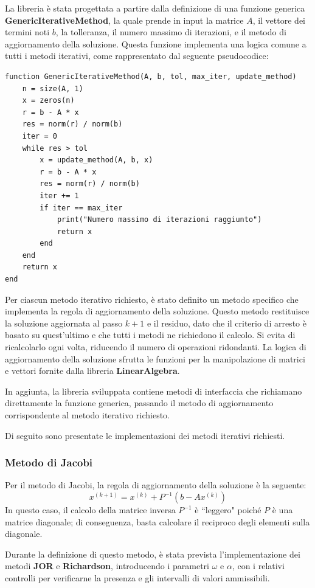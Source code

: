 La libreria è stata progettata a partire dalla definizione di una funzione generica
\textbf{GenericIterativeMethod}, la quale prende in input la matrice $A$, il
vettore dei termini noti $b$, la tolleranza, il numero massimo di iterazioni, e
il metodo di aggiornamento della soluzione. Questa funzione implementa una logica
comune a tutti i metodi iterativi, come rappresentato dal seguente pseudocodice:
\begin{verbatim}
function GenericIterativeMethod(A, b, tol, max_iter, update_method)
    n = size(A, 1)
    x = zeros(n)
    r = b - A * x
    res = norm(r) / norm(b)
    iter = 0
    while res > tol
        x = update_method(A, b, x)
        r = b - A * x
        res = norm(r) / norm(b)
        iter += 1
        if iter == max_iter
            print("Numero massimo di iterazioni raggiunto")
            return x
        end
    end
    return x
end
\end{verbatim}

Per ciascun metodo iterativo richiesto, è stato definito un metodo specifico che
implementa la regola di aggiornamento della soluzione. Questo metodo restituisce
la soluzione aggiornata al passo $k+1$ e il residuo, dato che il criterio di
arresto è basato su quest'ultimo e che tutti i metodi ne richiedono il calcolo.
Si evita di ricalcolarlo ogni volta, riducendo il numero di operazioni ridondanti.
La logica di aggiornamento della soluzione sfrutta le funzioni per la manipolazione
di matrici e vettori fornite dalla libreria \textbf{LinearAlgebra}.

In aggiunta, la libreria sviluppata contiene metodi di interfaccia che richiamano
direttamente la funzione generica, passando il metodo di aggiornamento corrispondente
al metodo iterativo richiesto.

Di seguito sono presentate le implementazioni dei metodi iterativi richiesti.
\subsubsection{Metodo di Jacobi}
Per il metodo di Jacobi, la regola di aggiornamento della soluzione è la seguente:
\begin{equation}
    x^{(k+1)} = x^{(k)} + P^{-1}(b - Ax^{(k)})
\end{equation}
In questo caso, il calcolo della matrice inversa $P^{-1}$ è ``leggero" poiché $P$
è una matrice diagonale; di conseguenza, basta calcolare il reciproco degli
elementi sulla diagonale.

Durante la definizione di questo metodo, è stata prevista l'implementazione dei
metodi \textbf{JOR} e \textbf{Richardson}, introducendo i parametri $\omega$ e
$\alpha$, con i relativi controlli per verificarne la presenza e gli intervalli
di valori ammissibili.
